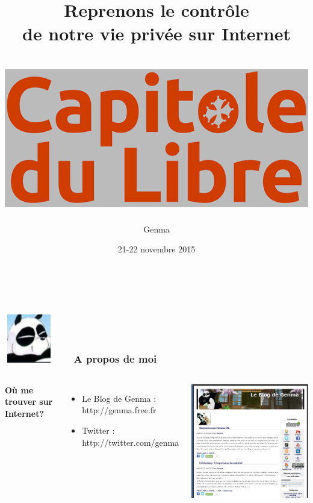 \documentclass{beamer}
\title[Reprenons le contrôle de notre vie privée sur Internet]{Reprenons le contrôle \\de notre vie privée sur Internet
\\~\\
\includegraphics[scale=0.2]{./images/logo-capitole.png}
}
\date{21-22 novembre 2015}
\author{Genma}
\begin{document}
\begin{frame}
	\titlepage
	\vfill
	\begin{center}
		\\[2.5ex]
		{\tiny\CcNote{\CcLongnameByNcSa}}
		\vspace*{-2.5ex}
	\end{center}
\end{frame}

\begin{frame}
\frametitle{\includegraphics[scale=0.4]{./images/Genma.jpg} \ \ \  A propos de moi  }
\begin{columns}[c] 
\textbf{Où me trouver sur Internet?}
\begin{itemize}
\item Le Blog de Genma : http://genma.free.fr
\item Twitter : http://twitter.com/genma
\end{itemize}
\includegraphics[scale=0.40] {./images/blog.png} 
\end{columns}
\end{frame}
\end{document}

